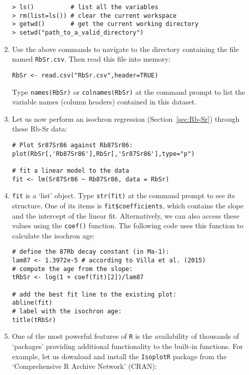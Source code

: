 \documentclass{book}
\begin{document}
\begin{enumerate}
\begin{verbatim}
> ls()          # list all the variables
> rm(list=ls()) # clear the current workspace
> getwd()       # get the current working directory
> setwd("path_to_a_valid_directory")
\end{verbatim}

\item Use the above commands to navigate to the directory containing the
file named \texttt{RbSr.csv}. Then read this file into memory:

\begin{verbatim}
RbSr <- read.csv("RbSr.csv",header=TRUE)
\end{verbatim}

Type \texttt{names(RbSr)} or \texttt{colnames(RbSr)} at the command
prompt to list the variable names (column headers) contained in this
dataset.

\item Let us now perform an isochron regression
  (Section~\ref{sec:Rb-Sr}) through these Rb-Sr data: \label{itm:lm}

\begin{verbatim}
# Plot Sr87Sr86 against Rb87Sr86:
plot(RbSr[,'Rb87Sr86'],RbSr[,'Sr87Sr86'],type="p")

# fit a linear model to the data
fit <- lm(Sr87Sr86 ~ Rb87Sr86, data = RbSr)
\end{verbatim}

\item \texttt{fit} is a `list' object. Type \texttt{str(fit)} at the
  command prompt to see its structure. One of its items is
  \verb|fit$coefficients|, which contains the slope and the intercept
  of the linear fit. Alternatively, we can also access these values
  using the \texttt{coef()} function. The following code uses this
  function to calculate the isochron age:

\begin{verbatim}
# define the 87Rb decay constant (in Ma-1):
lam87 <- 1.3972e-5 # according to Villa et al. (2015)
# compute the age from the slope:
tRbSr <- log(1 + coef(fit)[2])/lam87

# add the best fit line to the existing plot:
abline(fit)
# label with the isochron age: 
title(tRbSr)
\end{verbatim}

\item One of the most powerful features of \texttt{R} is the
  availability of thousands of `packages' providing additional
  functionality to the built-in functions.  For example, let us
  download and install the \texttt{IsoplotR} package from the
  `Comprehensive R Archive Network' (CRAN):


\end{enumerate}
\end{document}
